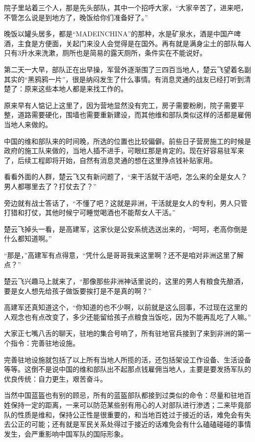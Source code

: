 院子里站着三个人，那是先头部队，其中一个招呼大家，“大家辛苦了，进来吧，不管怎么说是到地方了，晚饭给你们准备好了。”

晚饭以罐头居多，都是“MADEINCHINA”的那种，水是矿泉水，酒是中国产啤酒，主食是方便面，关起门来没人会觉得是在国外。再有就是满身尘土的部队每人只有3升水来洗漱，厕所也是简易的露天厕所，条件实在不能说好。

第二天一大早，部队正在出早操，军营外逐渐围了三四百当地人，楚云飞望着名副其实的“黑鸦鸦一片”，很是纳闷发生了什么事情。有消息灵通的战友已经打听到清楚了：原来这些本地人都是来找工作的。

原来早有人惦记上这里了，因为营地显然没有完工，房子需要粉刷，院子需要平整，道路需要硬化，围墙也需要重新建设，而其他维和部队类似这样的活都是雇佣当地人来做的。

中国的维和部队来的时间晚，所选的位置也比较偏僻。前些日子营房施工的时候是政府的施工队来做的，当地人插不进手，可眼红那是肯定的。现在好容易驻军来了，后续工程即将开始，自然有消息灵通的想在这里挣点钱补贴家用。

看看外面的人群，楚云飞又有新问题了，“来干活就干活吧，怎么来的全是女人？男人都哪里去了？打仗去了？”

旁边就有战士答话了，“不懂了吧？这就是非洲，干活就是女人的专利，男人只管打猎和打仗，其他时候宁可睡觉喝酒也不能帮女人干活。”

楚云飞掉头一看，是高建军，这家伙是公安系统选送出来的，“呵呵，老高你倒是什么都知道啊。”

“那是，”高建军有点得意，“凭什么是哥哥我来这里啊？还不是咱对非洲这里了解点？”

楚云飞兴趣马上就来了，“那像那些非洲神话里说的，这里的男人有粮食先酿酒，要是女人想先给孩子做饭要挨打是不是真的啊？”

高建军还真知道这个，“你知道的也不少啊，以前就是这么回事，不过现在这里的人观念也有点改变了，多少还能留给孩子点粮食当饭吃，因为不能再乱吃了人嘛。”

大家正七嘴八舌的聊天，驻地的集合号响了，所有驻地官兵接到了来到非洲的第一个指令：完善驻地设施。

完善驻地设施就包括了以上所有当地人所揽的活，还包括架设工作设备、生活设备等等。这倒不是说中国的维和部队出不起那点钱雇佣当地人，主要是要发扬军队的优良传统：自力更生，艰苦奋斗。

当然中国蓝盔也有别的顾忌，所有的蓝盔部队都接到过类似的命令：尽量和驻地百姓保持一定的距离，一来可以防范某些别有用心的人对部队进行渗透；二来毕竟部队的性质是维和，保持公正性是很重要的，和当地百姓过于接近的话，难免会有失去公正的可能；还有就是军民关系处得过于接近的话难免会有什么磕磕碰碰的事情发生，会严重影响中国军队的国际形象。

